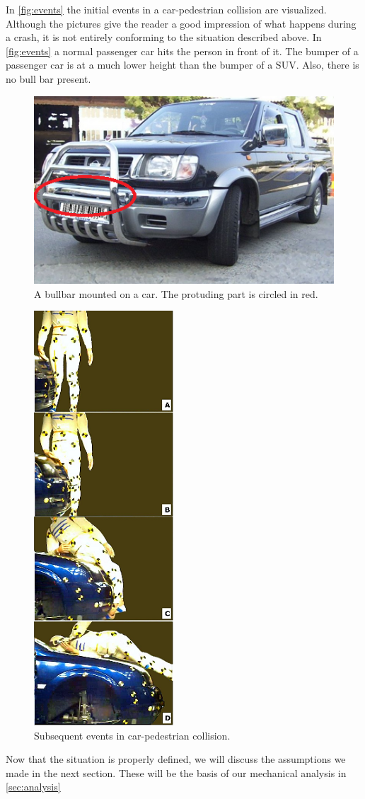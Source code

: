 In \autoref{fig:events} the initial events in a car-pedestrian collision are
visualized. Although the pictures give the reader a good impression of what
happens during a crash, it is not entirely conforming to the situation
described above. In \autoref{fig:events} a normal passenger car hits the
person in front of it. The bumper of a passenger car is at a much lower height
than the bumper of a SUV. Also, there is no bull bar present.

\begin{figure}[htp]
\begin{center}
  \includegraphics{img/bullbar.png}
  \caption{A bullbar mounted on a car. The protuding part is circled in red.}
  \label{fig:bullbar}
\end{center}
\end{figure}

\begin{figure}[htp]
\begin{center}
  \includegraphics{img/first_instance.png}
  \caption{Subsequent events in car-pedestrian collision.}
  \label{fig:events}
\end{center}
\end{figure}

Now that the situation is properly defined, we will discuss the
assumptions we made in the next section. These will be the basis of our
mechanical analysis in \autoref{sec:analysis}